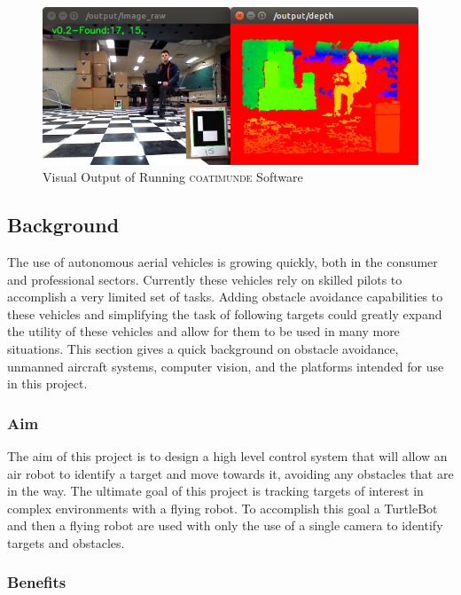 \documentclass{article}[12]
\begin{document}
	\begin{figure}[]
		\centering
		\includegraphics[width=0.95\linewidth]{results}
		\caption{Visual Output of Running \textsc{coatimunde} Software}
		\label{fig:prettyresultsimage}
	\end{figure}
	
	\subsection{Background}
	
	The use of autonomous aerial vehicles is growing quickly, both in the consumer and professional sectors. Currently these vehicles rely on skilled pilots to accomplish a very limited set of tasks. Adding obstacle avoidance capabilities to these vehicles and simplifying the task of following targets could greatly expand the utility of these vehicles and allow for them to be used in many more situations. This section gives a quick background on obstacle avoidance, unmanned aircraft systems, computer vision, and the platforms intended for use in this project.

		\subsubsection{Aim}
	
		The aim of this project is to design a high level control system that will allow an air robot to identify a target and move towards it, avoiding any obstacles that are in the way. The ultimate goal of this project is tracking targets of interest in complex environments with a flying robot. To accomplish this goal a TurtleBot and then a flying robot are used with only the use of a single camera to identify targets and obstacles. 
		
		\subsubsection{Benefits}
		
\end{document}
